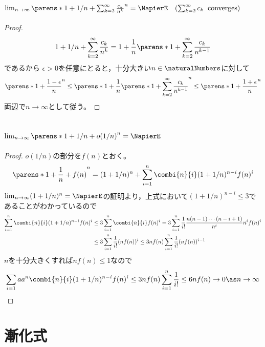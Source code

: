         \subsection{\texorpdfstring{$\lim_{n\rightarrow\infty}\parens*{1+1/n+\sum_{k=2}^\infty\frac{c_k}{n^k}}^n = \NapierE\quad(\sum_{k=2}^\infty c_k\;\;\mathrm{converges})$}{lim\_\{n→∞\} (1 + 1/n + Σ\_\{k=2\}\string^∞ c\_k/n\string^k)\string^n = e (Σ\_\{k=2→∞\}c\_k converges)}}
            \begin{proof}
                \[1+1/n+\sum_{k=2}^\infty\frac{c_k}{n^k} = 1+\frac{1}{n}\parens*{1+\sum_{k=2}^\infty\frac{c_k}{n^{k-1}}}\]
                であるから
                $\epsilon>0$を任意にとると，十分大きい$n\in\naturalNumbers$に対して
                \[\parens*{1+\frac{1-\epsilon}{n}}^n \leq \parens*{1+\frac{1}{n}\parens*{1+\sum_{k=2}^\infty\frac{c_k}{n^{k-1}}}}^n \leq \parens*{1+\frac{1+\epsilon}{n}}^n\]
                両辺で$n\rightarrow\infty$として従う。
            \end{proof}
        \subsection{\texorpdfstring{$\lim_{n\rightarrow\infty}\parens*{1+1/n+o(1/n)}^n = \NapierE$}{lim\_\{n→∞\} (1+1/n+o(1/n))\string^n = e}}
            \begin{proof}
                $o(1/n)$の部分を$f(n)$とおく。
                \[ \parens*{1+\frac{1}{n}+f(n)}^n = (1+1/n)^n + \sum_{i=1}^n \combi{n}{i}(1+1/n)^{n-i}f(n)^i \]
                $\lim_{n\to\infty}(1+1/n)^n = \NapierE$の証明より，上式において$(1+1/n)^{n-i}\leq 3$であることがわかっているので
                \begin{align*}
                    \sum_{i=1}^n \combi{n}{i}(1+1/n)^{n-i}f(n)^i &\leq 3\sum_{i=1}^n \combi{n}{i}f(n)^i = 3\sum_{i=1}^n \frac{1}{i!}\frac{n(n-1)\dotsm(n-i+1)}{n^i}n^if(n)^i \\
                    &\leq 3\sum_{i=1}^n \frac{1}{i!}(nf(n))^i \leq 3nf(n)\sum_{i=1}^n \frac{1}{i!}(nf(n))^{i-1}
                \end{align*}
                $n$を十分大きくすれば$nf(n)\leq 1$なので
                \[ \sum_{i=1}aa^n \combi{n}{i}(1+1/n)^{n-i}f(n)^i \leq 3nf(n)\sum_{i=1}^n \frac{1}{i!} \leq 6nf(n) \to 0 \as n\to\infty \]
            \end{proof}
    \section{漸化式}

